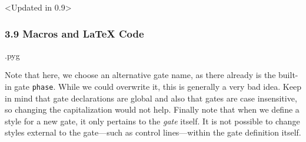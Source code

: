 \documentclass{scrartcl}
\makeatletter
\newenvironment{codeexample}{%
   \VerbatimEnvironment%
   \let\FVB@VerbatimOut\minted@FVB@VerbatimOut
   \let\FVE@VerbatimOut\minted@FVE@VerbatimOut
   \minted@configlang{tex}%
   \minted@fvset
   \begin{VerbatimOut}[codes={\catcode`\^^I=12},firstline,lastline]{\minted@jobname.pyg}%
}{
   \end{VerbatimOut}%
   \minted@langlinenoson%
   \savebox\codeexamplebox{ \minted@jobname.pyg}%
   \ifdim\wd\codeexamplebox>\dimexpr.5\linewidth-3mm\relax%
      \wd\codeexamplebox=.5\linewidth%
   \else%
      \wd\codeexamplebox=\dimexpr\wd\codeexamplebox+3mm\relax%
   \fi%
   \noindent\begin{minipage}{\wd\codeexamplebox}%
      \centering%
      \usebox\codeexamplebox%
   \end{minipage}%
   \begin{minipage}{\dimexpr\linewidth-\wd\codeexamplebox\relax}%
      \expandafter\minted@pygmentize\expandafter{\minted@lang}%
   \end{minipage}%
   \minted@langlinenosoff%
   \par%
}
\newenvironment{codeexample*}{%
   \VerbatimEnvironment%
   \let\FVB@VerbatimOut\minted@FVB@VerbatimOut
   \let\FVE@VerbatimOut\minted@FVE@VerbatimOut
   \minted@configlang{tex}%
   \minted@fvset
   \begin{VerbatimOut}[codes={\catcode`\^^I=12},firstline,lastline]{\minted@jobname.pyg}%
}{
   \end{VerbatimOut}%
   \minted@langlinenoson%
   \begin{adjustbox}{center}
       \minted@jobname.pyg %
   \end{adjustbox}\nopagebreak
   \expandafter\minted@pygmentize\expandafter{\minted@lang}%
   \minted@langlinenosoff%
   \par%
}
\def\ttlink{\link\texttt}
\makeatother
\begin{document}
            \begin{example}<Updated in 0.9>
               \begin{codeexample*}
               \end{codeexample*}
            \end{example}

         \clearpage
         \subsubsection{3.9 Macros and \LaTeX{} Code}
            \begin{example}
               \begin{codeexample}
               \end{codeexample}
               Note that here, we choose an alternative gate name, as there already is the built\hyp in gate \ttlink{phase}.
               While we could overwrite it, this is generally a very bad idea.
               Keep in mind that gate declarations are global and also that gates are case insensitive, so changing the capitalization would not help.
               Finally note that when we define a style for a new gate, it only pertains to the \emph{gate} itself.
               It is not possible to change styles external to the gate---such as control lines---within the gate definition itself.
            \end{example}
\end{document}
